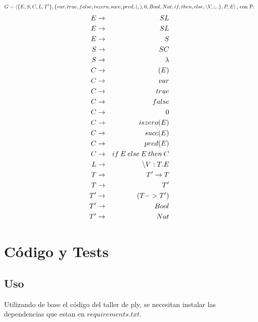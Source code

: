 \documentclass[spanish, a4paper]{article}
\begin{document}
$$G = \left<  \{E,S, C, L, T'\}, \{var, true, false, iszero, succ, pred, (, ), 0, Bool, Nat, if, then, else,  \textnormal{\textbackslash} V, :, . \}, P, E  \right> \textnormal{, con P:} $$
\begin{eqnarray}
 E  & \rightarrow  & S L \nonumber \\
  E  & \rightarrow & S L \nonumber \\
  E  & \rightarrow & S  \nonumber \\
  S  & \rightarrow & S C \nonumber \\
  S  & \rightarrow & \lambda  \nonumber\\
  C  &\rightarrow & (E)  \nonumber\\
  C &  \rightarrow & var  \nonumber\\
  C & \rightarrow & true  \nonumber\\
  C & \rightarrow & false  \nonumber\\
  C & \rightarrow & 0 \nonumber \\
  C & \rightarrow & iszero(E)  \nonumber\\
  C & \rightarrow & succ(E)  \nonumber\\
  C & \rightarrow & pred(E)  \nonumber\\
  C & \rightarrow & if \: E \: else \: E \: then \: C  \nonumber\\
  L & \rightarrow &  \textnormal{\textbackslash} V : T . E  \nonumber\\
  T & \rightarrow & T'  \rightarrow T  \nonumber\\
  T & \rightarrow & T'  \nonumber\\
  T' & \rightarrow & (T -> T')  \nonumber\\
  T' & \rightarrow & Bool  \nonumber\\
  T' &\rightarrow & Nat  \nonumber\\
\end{eqnarray}

\newpage
\section{Código y Tests}
\subsection{Uso}
Utilizando de base el código del taller de ply, se necesitan instalar las dependencias que estan en $requirements.txt$.
\end{document}
